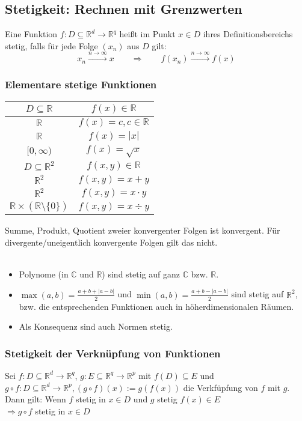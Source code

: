 \documentclass[10pt,a4paper^, twocolumn]{article}
\newcommand{\R}{\mathbb{R}}
\begin{document}
\subsection{Stetigkeit: Rechnen mit Grenzwerten}
	Eine Funktion $f : D \subseteq \R^d \to \R^q$ heißt 
	im Punkt $x \in D$ ihres Definitionsbereichs stetig, falls für jede Folge 
	$(x_n)$ aus $D$ gilt:
	$$
		x_n \overset{n \to \infty}{\to} x
		\qquad \Rightarrow \qquad
		f(x_n) \overset{n \to \infty}{\to} f(x)
	$$
	\subsubsection{Elementare stetige Funktionen}
	\begin{center}
	\newcommand{\infowidth}{2cm}
	\newcommand{\aufsichtwidth}{10cm}
	\begin{tabular}{|c|c|}
	\hline
	$D \subseteq \R$ &  $f(x) \in \R$ \\
	\hline
	$\R$ & $f(x) = c, c \in \R$\\
	$\R$ & $f(x) = |x|$\\
	$[0, \infty)$& $f(x) = \sqrt{x}$\\
	\hline
	$D \subseteq \R^2$ &  $f(x, y) \in \R$ \\
	\hline
	$\R^2$ & $f(x, y) = x+y$\\
	$\R^2$ & $f(x, y) = x \cdot y$\\
	$\R \times (\R \setminus \{0\}) $ & $f(x, y) = x \div y$\\
	\hline
	\end{tabular}
	\end{center}
	Summe, Produkt, Quotient zweier konvergenter Folgen ist konvergent. Für
	divergente/uneigentlich konvergente Folgen gilt das nicht.\\
	\\
	\begin{itemize}
	\item Polynome (in $\mathbb{C}$ und $\R$) sind stetig auf ganz $\mathbb{C}$ 
	bzw. $\R$.
	\item $\max(a,b) = \frac{a + b + |a-b|}{2}$ und $\min(a,b) = \frac{a+b - |a-b|}{2}$ 
	sind stetig auf $\R^2$, bzw. die entsprechenden Funktionen auch in 
	höherdimensionalen Räumen.
	\item Als Konsequenz sind auch Normen stetig.
	\end{itemize}
	
	
	\subsubsection{Stetigkeit der Verknüpfung von Funktionen}
		Sei $f : D \subseteq \R^d \to \R^q$, 
		$g : E \subseteq \R^q \to \R^p$ mit 
		$f(D) \subseteq E$ und \\
		$g \circ f : D \subseteq \R^d \to \R^p, 
		(g \circ f)(x) := g(f(x))$ die Verkfüpfung von $f$ mit $g$. 
		Dann gilt: Wenn $f$ stetig in $x \in D$ und $g$ stetig $f(x) \in E$\\
		$\Rightarrow g \circ f$ stetig in $x \in D$
\end{document}
